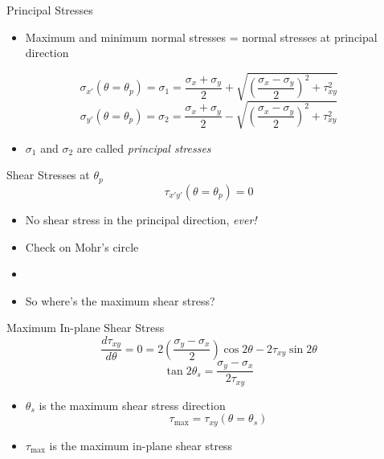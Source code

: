 \documentclass[10pt, svgnames]{beamer}
\begin{document}
\begin{frame}[label={sec:orgfebc1d6}]{Principal Stresses}
\begin{itemize}
\item Maximum and minimum normal stresses = normal stresses at principal
direction
\end{itemize}

\[\sigma_{x'} (\theta = \theta_p) = \sigma_1 = \dfrac{\sigma_x + \sigma_y}{2} + \sqrt{ \left( \dfrac{\sigma_x - \sigma_y}{2} \right)^2 + \tau_{xy}^2 }\]
\[\sigma_{y'} (\theta = \theta_p) = \sigma_2 = \dfrac{\sigma_x + \sigma_y}{2} - \sqrt{ \left( \dfrac{\sigma_x - \sigma_y}{2} \right)^2 + \tau_{xy}^2 }\]

\begin{itemize}
\item \(\sigma_1\) and \(\sigma_2\) are called \emph{principal stresses}
\end{itemize}
\end{frame}

\begin{frame}[label={sec:orgebf06b3}]{Shear Stresses at \(\theta_p\)}
\[\tau_{x'y'} (\theta = \theta_p) = 0\]

\begin{itemize}
\item No shear stress in the principal direction, \emph{ever!}

\item Check on Mohr's circle

\item 


\item So where's the maximum shear stress?
\end{itemize}
\end{frame}

\begin{frame}[label={sec:orge1472b1}]{Maximum In-plane Shear Stress}
\[\dfrac{d\tau_{xy}}{d\theta} = 0 = 2\left( \dfrac{\sigma_y - \sigma_x}{2} \right) \cos 2\theta - 2\tau_{xy} \sin 2\theta\]
\[\tan 2\theta_s = \dfrac{\sigma_y - \sigma_x}{2\tau_{xy}}\]

\begin{itemize}
\item \(\theta_s\) is the maximum shear stress direction
\[\tau_{\max} = \tau_{xy} (\theta = \theta_s)\]

\item \(\tau_{\max}\) is the maximum in-plane shear stress
\end{itemize}
\end{frame}
\end{document}
